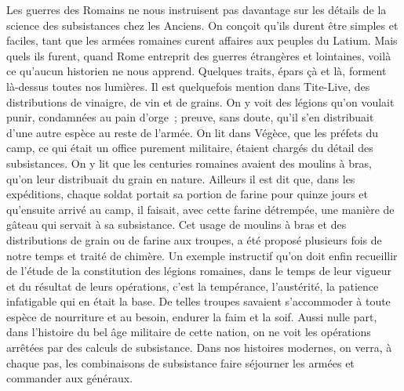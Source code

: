\documentclass[french,twoside]{book} %
\begin{document}
Les guerres des Romains ne nous instruisent pas davantage sur les détails de la science des subsistances chez les Anciens. On conçoit qu’ils durent être simples et faciles, tant que les armées romaines curent affaires aux peuples du Latium. Mais quels ils furent, quand Rome entreprit des guerres étrangères et lointaines, voilà ce qu’aucun historien ne nous apprend. Quelques traits, épars çà et là, forment là-dessus toutes nos lumières. Il est quelquefois mention dans Tite-Live, des distributions de vinaigre, de vin et de grains. On y voit des légions qu’on voulait punir, condamnées au pain d’orge ; preuve, sans doute, qu’il s’en distribuait d’une autre espèce au reste de l’armée. On lit dans Végèce, que les préfets du camp, ce qui était un office purement militaire, étaient chargés du détail des subsistances. On y lit que les centuries romaines avaient des moulins à bras, qu’on leur distribuait du grain en nature. Ailleurs il est dit que, dans les expéditions, chaque soldat portait sa portion de farine pour quinze jours et qu’ensuite arrivé au camp, il faisait, avec cette farine détrempée, une manière de gâteau qui servait à sa subsistance. Cet usage de moulins à bras et des distributions de grain ou de farine aux troupes, a été proposé plusieurs fois de notre temps et traité de chimère. Un exemple instructif qu’on doit enfin recueillir de l’étude de la constitution des légions romaines, dans le temps de leur vigueur et du résultat de leurs opérations, c’est la tempérance, l’austérité, la patience infatigable qui en était la base. De telles troupes savaient s’accommoder à toute espèce de nourriture et au besoin, endurer la faim et la soif. Aussi nulle part, dans l’histoire du bel âge militaire de cette nation, on ne voit les opérations arrêtées par des calculs de subsistance. Dans nos histoires modernes, on verra, à chaque pas, les combinaisons de subsistance faire séjourner les armées et commander aux généraux.\par
\end{document}
